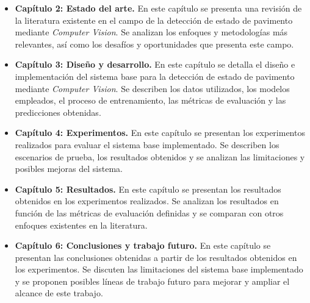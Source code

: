 \begin{itemize}
    \item \textbf{Capítulo 2: Estado del arte.} En este capítulo se presenta una revisión de la literatura existente en el campo de la detección de estado de pavimento mediante \textit{Computer Vision}. Se analizan los enfoques y metodologías más relevantes, así como los desafíos y oportunidades que presenta este campo.
    
    \item \textbf{Capítulo 3: Diseño y desarrollo.} En este capítulo se detalla el diseño e implementación del sistema base para la detección de estado de pavimento mediante \textit{Computer Vision}. Se describen los datos utilizados, los modelos empleados, el proceso de entrenamiento, las métricas de evaluación y las predicciones obtenidas.
    
    \item \textbf{Capítulo 4: Experimentos.} En este capítulo se presentan los experimentos realizados para evaluar el sistema base implementado. Se describen los escenarios de prueba, los resultados obtenidos y se analizan las limitaciones y posibles mejoras del sistema.
    
    \item \textbf{Capítulo 5: Resultados.} En este capítulo se presentan los resultados obtenidos en los experimentos realizados. Se analizan los resultados en función de las métricas de evaluación definidas y se comparan con otros enfoques existentes en la literatura.
    
    \item \textbf{Capítulo 6: Conclusiones y trabajo futuro.} En este capítulo se presentan las conclusiones obtenidas a partir de los resultados obtenidos en los experimentos. Se discuten las limitaciones del sistema base implementado y se proponen posibles líneas de trabajo futuro para mejorar y ampliar el alcance de este trabajo.
\end{itemize}
